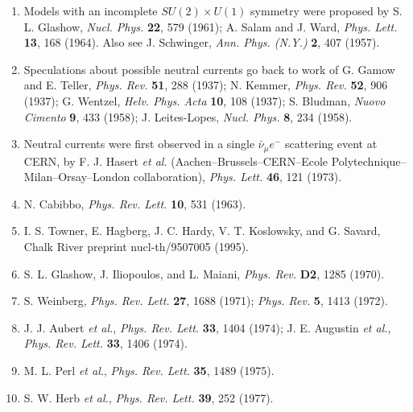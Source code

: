 \begin{enumerate}
\item {}\label{ch21-ref-8}
Models with an incomplete $SU(2)\times U(1)$ symmetry were proposed by
S. L. Glashow, \emph{Nucl. Phys.} \textbf{22}, 579 (1961); A. Salam and
J. Ward, \emph{Phys. Lett.} \textbf{13}, 168 (1964). Also see
J. Schwinger, \emph{Ann. Phys. (N.Y.)} \textbf{2}, 407 (1957).

\item {}\label{ch21-ref-9}
Speculations about possible neutral currents go back to work of G. Gamow
and E. Teller, \emph{Phys. Rev.} \textbf{51}, 288 (1937); N. Kemmer,
\emph{Phys. Rev.} \textbf{52}, 906 (1937); G. Wentzel,
\emph{Helv. Phys. Acta} \textbf{10}, 108 (1937); S. Bludman,
\emph{Nuovo Cimento} \textbf{9}, 433 (1958); J. Leites-Lopes,
\emph{Nucl. Phys.} \textbf{8}, 234 (1958).

\item {}\label{ch21-ref-10}
Neutral currents were first observed in a single $\bar\nu_\mu e^-$
scattering event at CERN, by F. J. Hasert \emph{et al.}
(Aachen--Brussels--CERN--Ecole Polytechnique--Milan--Orsay--London
collaboration), \emph{Phys. Lett.} \textbf{46}, 121 (1973).

\item {}\label{ch21-ref-11}
N. Cabibbo, \emph{Phys. Rev. Lett.} \textbf{10}, 531 (1963).

\item {}\label{ch21-ref-12}
I. S. Towner, E. Hagberg, J. C. Hardy, V. T. Koslowsky, and G. Savard,
Chalk River preprint nucl-th/9507005 (1995).

\item {}\label{ch21-ref-13}
S. L. Glashow, J. Iliopoulos, and L. Maiani, \emph{Phys. Rev.}
\textbf{D2}, 1285 (1970).

\item {}\label{ch21-ref-14}
S. Weinberg, \emph{Phys. Rev. Lett.} \textbf{27}, 1688 (1971);
\emph{Phys. Rev.} \textbf{5}, 1413 (1972).

\item {}\label{ch21-ref-15}
J. J. Aubert \emph{et al.}, \emph{Phys. Rev. Lett.} \textbf{33}, 1404
(1974); J. E. Augustin \emph{et al.}, \emph{Phys. Rev. Lett.}
\textbf{33}, 1406 (1974).

\item {}\label{ch21-ref-16}
M. L. Perl \emph{et al.}, \emph{Phys. Rev. Lett.} \textbf{35}, 1489
(1975).

\item {}\label{ch21-ref-17}
S. W. Herb \emph{et al.}, \emph{Phys. Rev. Lett.} \textbf{39}, 252
(1977).


\end{enumerate}
